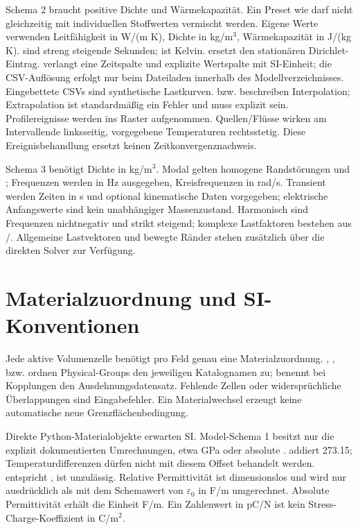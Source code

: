 Schema 2 braucht positive Dichte und Wärmekapazität. Ein Preset wie
 darf nicht gleichzeitig mit individuellen
Stoffwerten vermischt werden. Eigene Werte verwenden Leitfähigkeit in
W/(m K), Dichte in kg/m$^3$, Wärmekapazität in J/(kg K). 
sind streng steigende Sekunden;  ist Kelvin.
 ersetzt den stationären Dirichlet-Eintrag.
 verlangt eine Zeitspalte und explizite Wertspalte mit
SI-Einheit; die CSV-Auflösung erfolgt nur beim Dateiladen innerhalb des
Modellverzeichnisses. Eingebettete CSVs sind synthetische Lastkurven.
 bzw.  beschreiben Interpolation;
Extrapolation ist standardmäßig ein Fehler und  muss explizit sein.
Profilereignisse werden ins Raster aufgenommen. Quellen/Flüsse wirken am
Intervallende linksseitig, vorgegebene Temperaturen rechtsstetig.
Diese Ereignisbehandlung ersetzt keinen Zeitkonvergenznachweis.

Schema 3 benötigt Dichte in kg/m$^3$. Modal gelten homogene Randstörungen
und ; Frequenzen werden in Hz ausgegeben, Kreisfrequenzen
in rad/s. Transient werden Zeiten in s und optional kinematische Daten
vorgegeben; elektrische Anfangswerte sind kein unabhängiger Massenzustand.
Harmonisch sind Frequenzen nichtnegativ und strikt steigend; komplexe
Lastfaktoren bestehen aus /. Allgemeine Lastvektoren und
bewegte Ränder stehen zusätzlich über die direkten Solver zur Verfügung.

\section{Materialzuordnung und SI-Konventionen}
Jede aktive Volumenzelle benötigt pro Feld genau eine Materialzuordnung.
, ,  bzw.
 ordnen Physical-Groups den jeweiligen Katalognamen zu;
 benennt bei Kopplungen den Ausdehnungsdatensatz.
Fehlende Zellen oder widersprüchliche Überlappungen sind Eingabefehler.
Ein Materialwechsel erzeugt keine automatische neue Grenzflächenbedingung.

Direkte Python-Materialobjekte erwarten SI. Model-Schema 1 besitzt nur die
explizit dokumentierten Umrechnungen, etwa GPa oder absolute .
 addiert 273.15; Temperaturdifferenzen dürfen nicht mit diesem
Offset behandelt werden.  entspricht ,
 ist unzulässig. Relative Permittivität ist dimensionslos und
wird nur ausdrücklich als  mit dem Schemawert von
$\varepsilon_0$ in F/m umgerechnet. Absolute Permittivität erhält die Einheit
F/m. Ein Zahlenwert in pC/N ist kein Stress-Charge-Koeffizient in C/m$^2$.

